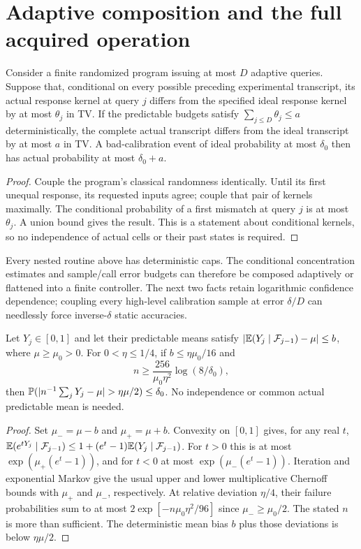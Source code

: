 \section{Adaptive composition and the full acquired operation}

\begin{lemma}\label{lem:adaptive}
Consider a finite randomized program issuing at most $D$ adaptive queries.
Suppose that, conditional on every possible preceding experimental
transcript, its actual response kernel at query $j$ differs from the
specified ideal response kernel by at most $\theta_j$ in TV. If the
predictable budgets satisfy $\sum_{j\le D}\theta_j\le a$ deterministically,
the complete actual transcript differs from the ideal transcript by at most
$a$ in TV. A bad-calibration event of ideal probability at most $\delta_0$
then has actual probability at most $\delta_0+a$.
\end{lemma}
\begin{proof}
Couple the program's classical randomness identically. Until its first
unequal response, its requested inputs agree; couple that pair of kernels
maximally. The conditional probability of a first mismatch at query $j$
is at most $\theta_j$. A union bound gives the result. This is a statement
about conditional kernels, so no independence of actual cells or their
past states is required.
\end{proof}

Every nested routine above has deterministic caps. The conditional
concentration estimates and sample/call error budgets can therefore be
composed adaptively or flattened into a finite controller. The next two
facts retain logarithmic confidence dependence; coupling every high-level
calibration sample at error $\delta/D$ can needlessly force inverse-$\delta$
static accuracies.

\begin{lemma}\label{lem:means}
Let $Y_j\in[0,1]$ and let their predictable means satisfy
$|\mathbb E(Y_j\mid\mathcal F_{j-1})-\mu|\le b$, where $\mu\ge\mu_0>0$.
For $0<\eta\le1/4$, if $b\le\eta\mu_0/16$ and
\[
 n\ge\frac{256}{\mu_0\eta^2}\log(8/\delta_0),
\]
then $\Prb(|n^{-1}\sum_jY_j-\mu|>\eta\mu/2)\le\delta_0$.
No independence or common actual predictable mean is needed.
\end{lemma}
\begin{proof}
Set $\mu_-=\mu-b$ and $\mu_+=\mu+b$. Convexity on $[0,1]$ gives,
for any real $t$,
$\mathbb E(e^{tY_j}\mid\mathcal F_{j-1})
 \le1+(e^t-1)\mathbb E(Y_j\mid\mathcal F_{j-1})$.
For $t>0$ this is at most $\exp(\mu_+(e^t-1))$, and for $t<0$
at most $\exp(\mu_-(e^t-1))$. Iteration and exponential Markov give
the usual upper and lower multiplicative Chernoff bounds with $\mu_+$
and $\mu_-$, respectively. At relative deviation $\eta/4$, their
failure probabilities sum to at most
$2\exp[-n\mu_0\eta^2/96]$ since $\mu_-\ge\mu_0/2$.
The stated $n$ is more than sufficient. The deterministic mean bias $b$
plus those deviations is below $\eta\mu/2$.
\end{proof}


